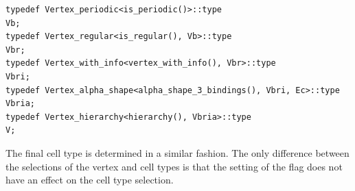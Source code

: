 \begin{lstfloat}
  \begin{lstlisting}[style=cppFramedStyle,basicstyle=\normalsize,%
                     label={lst:iiitriFinalVertex},%
                     caption={The final 3D Triangulation vertex type definition.}]
typedef Vertex_periodic<is_periodic()>::type                         Vb;
typedef Vertex_regular<is_regular(), Vb>::type                       Vbr;
typedef Vertex_with_info<vertex_with_info(), Vbr>::type              Vbri;
typedef Vertex_alpha_shape<alpha_shape_3_bindings(), Vbri, Ec>::type Vbria;
typedef Vertex_hierarchy<hierarchy(), Vbria>::type                   V;
  \end{lstlisting}
\end{lstfloat}

The final cell type is determined in a similar fashion. The only
difference between the selections of the vertex and cell types is that
the setting of the \cmake{} flag 
does not have an effect on the cell type selection. 
